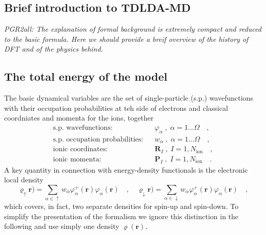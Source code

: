 \documentclass[final,1p]{elsarticle}
\newcommand{\PGRcomm}[1]{{\color{blue}\small\em PGR2all: #1}}
\begin{document}
\subsection{Brief introduction to TDLDA-MD}

\PGRcomm{The explanation of formal background is extremely compact and
reduced to the basic formula. Here we should provide a breif overview
of the history of DFT and of the physics behind.}

\subsection{The total energy of the model}
\label{sec:Etot}

The basic dynamical variables are the set of single-particle
(s.p.) wavefunctions with their occupation probabilities at teh side
of electrons and classical coordniates and momenta for the ions,
together
\begin{equation}
\begin{array}{lcl}
  \mbox{s.p. wavefunctions:} && 
  \varphi_\alpha\;,\;\alpha=1...\Omega
  \quad,
\\
  \mbox{s.p. occupation probabilities:} && 
  w_\alpha\;,\;\alpha=1...\Omega
  \quad,
\\
  \mbox{ionic coordinates:} &&
  \mathbf{R}_I\;,\; I=1,N_\mathrm{ion}
  \quad,
\\
  \mbox{ionic momenta:} &&
  \mathbf{P}_I\;,\; I=1,N_\mathrm{ion}
  \quad.
\end{array}
\end{equation}
A key quantity in connection with energy-density functionals
is the electronic local density 
\begin{equation}
  \varrho_\uparrow\mathbf{r})
  =
  \sum_{\alpha\in\uparrow}w_\alpha
  \varphi_\alpha^+(\mathbf{r})\varphi_\alpha^{\mbox{}}(\mathbf{r})
  \quad,\quad
  \varrho_\downarrow\mathbf{r})
  =
  \sum_{\alpha\in\downarrow}w_\alpha
  \varphi_\alpha^+(\mathbf{r})\varphi_\alpha^{\mbox{}}(\mathbf{r})
  \quad,
\label{eq:locdens}
\end{equation}
which covers, in fact, two separate densities for spin-up and
spin-down. To simplify the presentation of the formalism we
ignore this distinction in the following and use simply
one density $\varrho(\mathbf{r})$.
\end{document}

